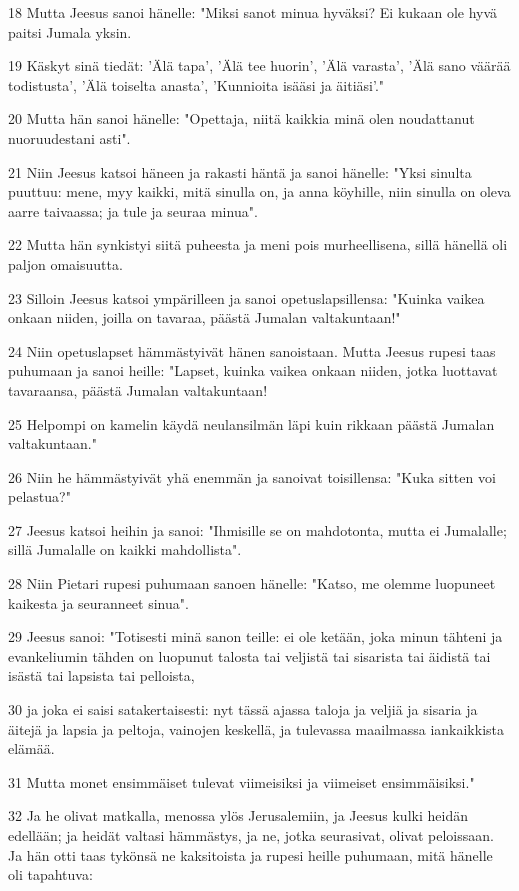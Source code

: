 \par 18 Mutta Jeesus sanoi hänelle: "Miksi sanot minua hyväksi? Ei kukaan ole hyvä paitsi Jumala yksin.
\par 19 Käskyt sinä tiedät: 'Älä tapa', 'Älä tee huorin', 'Älä varasta', 'Älä sano väärää todistusta', 'Älä toiselta anasta', 'Kunnioita isääsi ja äitiäsi'."
\par 20 Mutta hän sanoi hänelle: "Opettaja, niitä kaikkia minä olen noudattanut nuoruudestani asti".
\par 21 Niin Jeesus katsoi häneen ja rakasti häntä ja sanoi hänelle: "Yksi sinulta puuttuu: mene, myy kaikki, mitä sinulla on, ja anna köyhille, niin sinulla on oleva aarre taivaassa; ja tule ja seuraa minua".
\par 22 Mutta hän synkistyi siitä puheesta ja meni pois murheellisena, sillä hänellä oli paljon omaisuutta.
\par 23 Silloin Jeesus katsoi ympärilleen ja sanoi opetuslapsillensa: "Kuinka vaikea onkaan niiden, joilla on tavaraa, päästä Jumalan valtakuntaan!"
\par 24 Niin opetuslapset hämmästyivät hänen sanoistaan. Mutta Jeesus rupesi taas puhumaan ja sanoi heille: "Lapset, kuinka vaikea onkaan niiden, jotka luottavat tavaraansa, päästä Jumalan valtakuntaan!
\par 25 Helpompi on kamelin käydä neulansilmän läpi kuin rikkaan päästä Jumalan valtakuntaan."
\par 26 Niin he hämmästyivät yhä enemmän ja sanoivat toisillensa: "Kuka sitten voi pelastua?"
\par 27 Jeesus katsoi heihin ja sanoi: "Ihmisille se on mahdotonta, mutta ei Jumalalle; sillä Jumalalle on kaikki mahdollista".
\par 28 Niin Pietari rupesi puhumaan sanoen hänelle: "Katso, me olemme luopuneet kaikesta ja seuranneet sinua".
\par 29 Jeesus sanoi: "Totisesti minä sanon teille: ei ole ketään, joka minun tähteni ja evankeliumin tähden on luopunut talosta tai veljistä tai sisarista tai äidistä tai isästä tai lapsista tai pelloista,
\par 30 ja joka ei saisi satakertaisesti: nyt tässä ajassa taloja ja veljiä ja sisaria ja äitejä ja lapsia ja peltoja, vainojen keskellä, ja tulevassa maailmassa iankaikkista elämää.
\par 31 Mutta monet ensimmäiset tulevat viimeisiksi ja viimeiset ensimmäisiksi."
\par 32 Ja he olivat matkalla, menossa ylös Jerusalemiin, ja Jeesus kulki heidän edellään; ja heidät valtasi hämmästys, ja ne, jotka seurasivat, olivat peloissaan. Ja hän otti taas tykönsä ne kaksitoista ja rupesi heille puhumaan, mitä hänelle oli tapahtuva:
